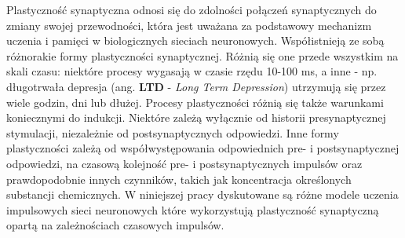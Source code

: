 Plastyczność synaptyczna odnosi się do zdolności połączeń synaptycznych do zmiany swojej przewodności, która jest uważana za podstawowy mechanizm uczenia i pamięci w biologicznych sieciach neuronowych. Współistnieją ze sobą różnorakie formy plastyczności synaptycznej. Różnią się one przede wszystkim na skali czasu: niektóre procesy wygasają w czasie rzędu 10-100 ms, a inne - np. długotrwała depresja (ang. \textbf{LTD} - \textit{Long Term Depression}) utrzymują się przez wiele godzin, dni lub dłużej. Procesy plastyczności różnią się także warunkami koniecznymi do indukcji. Niektóre zależą wyłącznie od historii presynaptycznej stymulacji, niezależnie od postsynaptycznych odpowiedzi. Inne formy plastyczności zależą od współwystępowania odpowiednich pre- i postsynaptycznej odpowiedzi, na czasową kolejność pre- i postsynaptycznych impulsów oraz prawdopodobnie innych czynników, takich jak koncentracja określonych substancji chemicznych. 
W niniejszej pracy dyskutowane są różne modele uczenia impulsowych sieci neuronowych które wykorzystują plastyczność synaptyczną opartą na zależnościach czasowych impulsów.
